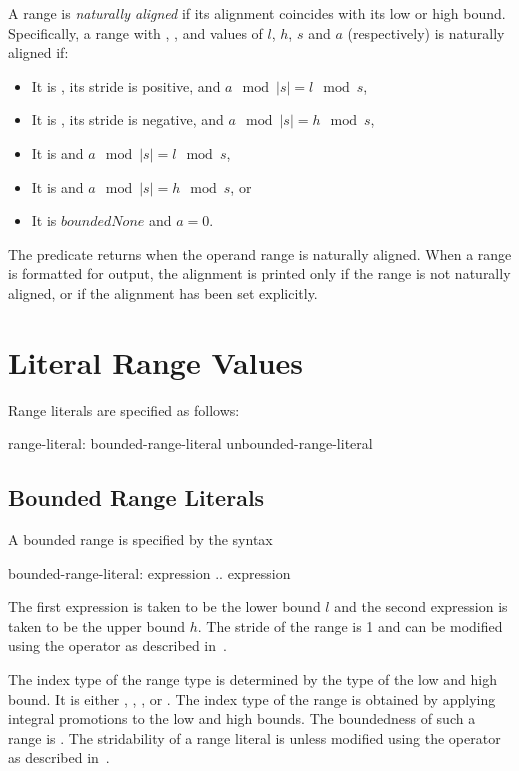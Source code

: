 A range is \emph{naturally aligned} if its alignment coincides with its low or
high bound.  Specifically, a range with , , 
and  values of $l$, $h$, $s$ and $a$ (respectively) is naturally aligned if:
\begin{itemize}
\item It is , its stride is positive, and $a\!\mod |s| = l\!\mod s$,
\item It is , its stride is negative, and $a\!\mod |s| = h\!\mod s$,
\item It is  and $a\!\mod |s| = l\!\mod s$,
\item It is  and $a\!\mod |s| = h\!\mod s$, or
\item It is $boundedNone$ and $a = 0$.
\end{itemize}
\noindent The  predicate returns  when the operand
range is naturally aligned.  When a range is formatted for output, the alignment
is printed only if the range is not naturally aligned, or if the alignment has
been set explicitly.

\section{Literal Range Values}
\label{Range_Literals}

Range literals are specified as follows:
\begin{syntax}
range-literal:
  bounded-range-literal
  unbounded-range-literal
\end{syntax}

\subsection{Bounded Range Literals}
\label{Bounded_Ranges}

A bounded range is specified by the syntax
\begin{syntax}
bounded-range-literal:
  expression .. expression
\end{syntax}
The first expression is taken to be the lower bound $l$ and the second
expression is taken to be the upper bound $h$.  The stride of the
range is 1 and can be modified using the  operator as described
in~.  

The index type of the range type is determined by the type of the
low and high bound.  It is either , ,
, or .  The index type of the range is obtained by
applying integral promotions to the low and high bounds.  The boundedness
of such a range is .  The stridability of a range literal
is  unless modified using the  operator as described 
in~.

